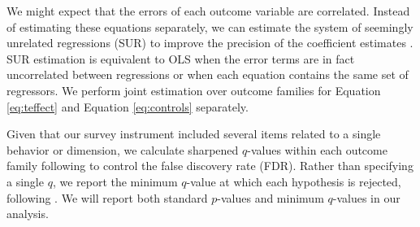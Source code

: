 \documentclass[12pt]{article}
\begin{document}
		We might expect that the errors of each outcome variable are correlated. Instead of estimating these equations separately, we can estimate the system of seemingly unrelated regressions (SUR) to improve the precision of the coefficient estimates . SUR estimation is equivalent to OLS when the error terms are in fact uncorrelated between regressions or when each equation contains the same set of regressors. We perform joint estimation over outcome families for Equation \ref{eq:teffect} and Equation \ref{eq:controls} separately.

		Given that our survey instrument included several items related to a single behavior or dimension, we calculate sharpened $q$-values within each outcome family following  to control the false discovery rate (FDR). Rather than specifying a single $q$, we report the minimum $q$-value at which each hypothesis is rejected, following . We will report both standard $p$-values and minimum $q$-values in our analysis.

\end{document}
